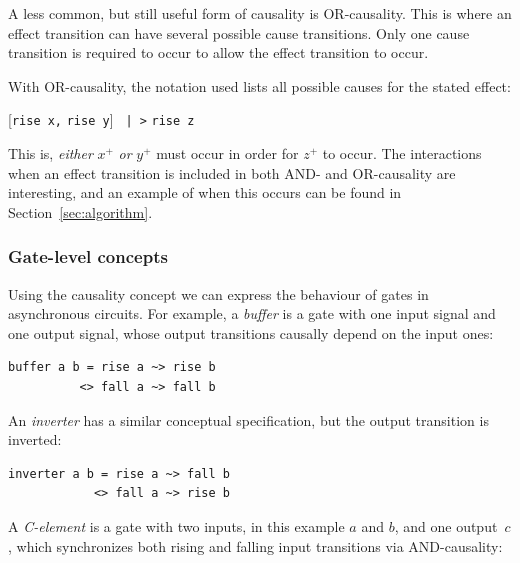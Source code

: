 \documentclass[british,conference,compsoc]{IEEEtran}
\begin{document}
A less common, but still useful form of causality is OR-causality. This is 
where an effect transition can have several possible cause transitions. Only 
one cause transition is required to occur to allow the effect transition to 
occur. 

With OR-causality, the notation used lists all possible causes for the stated 
effect:

\vspace{-1.5mm}

\begin{center}
      [\texttt{rise x,} \texttt{rise y}] \texttt{~|~>} \texttt{rise z}
\end{center}

\vspace{-1mm}

This is, \emph{either} $x^{+}$ \emph{or} $y^{+}$ must occur in order for 
$z^{+}$ to occur. The interactions when an effect transition is included in both AND- and 
OR-causality are interesting, and an example of when this occurs can be found 
in Section~\ref{sec:algorithm}.

\vspace{-2mm}

\subsubsection{Gate-level concepts \label{subsub:gate-level}} Using the causality concept we can express
the behaviour of gates in asynchronous circuits. For example, a \emph{buffer}
is a gate with one input signal and one output signal,
whose output transitions causally depend on the input ones:

\begin{verbatim}
buffer a b = rise a ~> rise b 
          <> fall a ~> fall b
\end{verbatim}

\noindent An \emph{inverter} has a similar conceptual specification, but the
output transition is inverted:

\begin{verbatim}
inverter a b = rise a ~> fall b
            <> fall a ~> rise b
\end{verbatim}

\noindent A \emph{C-element} is a gate with two inputs, in this example $a$ and $b$, and one
output~$c$, which synchronizes both rising and falling input transitions
via AND-causality:
\end{document}
